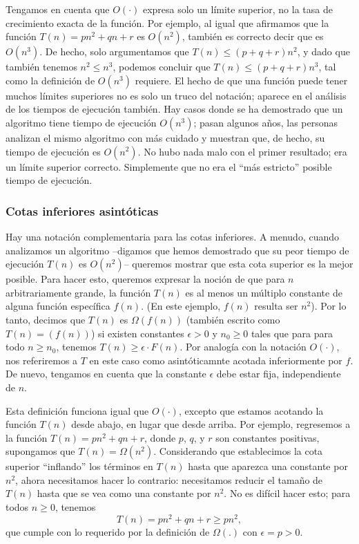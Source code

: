 \documentclass[a4paper, 12pt]{book}
\begin{document}
Tengamos en cuenta que $O(\cdot)$ expresa solo un límite superior, no la tasa de crecimiento exacta de la función. 
Por ejemplo, al igual que afirmamos que la función $T(n) = pn^2 + qn + r$ es $O(n^2)$, también es correcto decir que es $O(n^3)$. De hecho, solo argumentamos que $T(n) \leq (p + q + r) n^2$, y dado que también tenemos $n^2 \leq n^3$, podemos concluir que $T(n) \leq (p + q + r) n^3$, tal como la definición de $O(n^3)$ requiere. El hecho de que una función puede tener muchos límites superiores no es solo un truco del notación; aparece en el análisis de los tiempos de ejecución también. Hay casos donde se ha demostrado que un algoritmo tiene tiempo de ejecución $O(n^3)$; pasan algunos años, las personas analizan el mismo algoritmo con más cuidado y muestran que, de hecho, su tiempo de ejecución es $O(n^2)$. No hubo nada malo con el primer resultado; era un límite superior correcto. Simplemente que no era el ``más estricto'' posible tiempo de ejecución. 

\subsubsection*{Cotas inferiores asintóticas}

Hay una notación complementaria para las cotas inferiores. A menudo, cuando analizamos un algoritmo --digamos que hemos demostrado que su peor tiempo de ejecución $T(n)$ es $O(n^2)$-- queremos mostrar que esta cota superior es la mejor posible. Para hacer esto, queremos expresar la noción de que para $n$ arbitrariamente grande, la función $T(n)$ es al menos un múltiplo constante de alguna función específica $f(n)$. (En este ejemplo, $f(n)$ resulta ser $n^2$). Por lo tanto, decimos que $T(n)$ es $\Omega(f(n))$ (también escrito como $T(n)=(f(n))$) si existen constantes $\epsilon > 0$ y $n_0 \geq 0$ tales que para para todo $n \geq n_0$, tenemos $T(n) \geq \epsilon \cdot F(n)$. Por analogía con la notación  $O(\cdot)$, nos referiremos a $T$ en este caso como asintóticamnte acotada inferiormente por $f$. De nuevo, tengamos en cuenta que la constante $\epsilon$ debe estar fija, independiente de $n$.

Esta definición funciona igual que $O(\cdot)$, excepto que estamos acotando la función $T(n)$ desde abajo, en lugar que desde arriba. Por ejemplo, regresemos a la función $T(n) = pn^2+ qn + r$,  donde $p$, $q$, y $r$ son constantes positivas, supongamos que $T(n)=\Omega(n^2)$. Considerando que establecimos la cota superior ``inflando'' los términos en $T(n)$ hasta que aparezca una constante por $n^2$, ahora necesitamos hacer lo contrario: necesitamos reducir el tamaño de $T(n)$ hasta que se vea como una constante por $n^2$. No es difícil hacer esto; para todos $n \geq 0$, tenemos 
%
$$T(n) = pn^2 + qn + r ≥ pn^2,$$
%
que cumple con lo requerido por la definición de $\Omega(.)$ con $\epsilon = p > 0$. 
\end{document}
